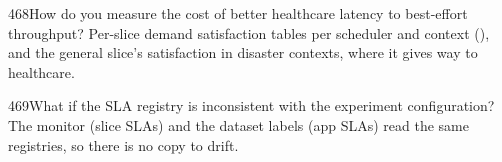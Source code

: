 \begin{qa}{468}{How do you measure the cost of better healthcare latency to best-effort throughput?}
Per-slice demand satisfaction tables per scheduler and context (), and the general slice's
satisfaction in disaster contexts, where it gives way to healthcare.
\end{qa}

\begin{qa}{469}{What if the SLA registry is inconsistent with the experiment configuration?}
The monitor (slice SLAs) and the dataset labels (app SLAs) read the same registries, so there is no copy to drift.
\end{qa}

\FigLoad

